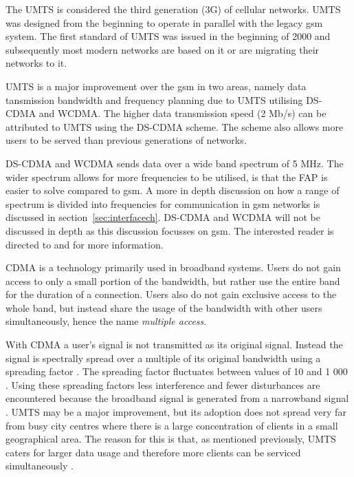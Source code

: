 The \gls{UMTS} is considered the third generation (3G) of cellular networks\cite{tabuglobalplanning3g,Eisenblatter}. \gls{UMTS} was designed from the beginning to operate in parallel with the legacy \gls{gsm} system. The first standard of \gls{UMTS} was issued in the beginning of 2000 and subsequently most modern networks are based on it or are migrating their networks to it\cite{tabuglobalplanning3g,Eisenblatter}.

UMTS is a major improvement over the \gls{gsm} in two areas, namely data tansmission bandwidth and frequency planning due to \gls{UMTS} utilising \gls{DS-CDMA} and \gls{WCDMA}\cite{tabuglobalplanning3g,Eisenblatter}. The higher data transmission speed (2 Mb/s) can be attributed to \gls{UMTS} using the \gls{DS-CDMA} scheme\cite{tabuglobalplanning3g,Eisenblatter}. The scheme also allows more users to be served than previous generations of networks\cite{tabuglobalplanning3g,Eisenblatter}. 

DS-CDMA and \gls{WCDMA} sends data over a wide band spectrum of 5 MHz. The wider spectrum allows for more frequencies to be utilised, is that the \gls{FAP} is easier to solve compared to \gls{gsm}\cite{tabuglobalplanning3g,Eisenblatter}\@. A more in depth discussion on how a range of spectrum is divided into frequencies for communication in \gls{gsm} networks is discussed in section~\ref{sec:interfacech}. \gls{DS-CDMA} and \gls{WCDMA} will not be discussed in depth as this discussion focusses on \gls{gsm}\@. The interested reader is directed to \cite{tabuglobalplanning3g} and \cite{wirelesstelcoMullet} for more information.

\Gls{CDMA} is a technology primarily used in broadband systems\cite{GSMArchitectureProtocolsServices}. Users do not gain access to only a small portion of the bandwidth, but rather use the entire band for the duration of a connection\cite{GSMArchitectureProtocolsServices}. Users also do not gain exclusive access to the whole band, but instead share the usage of the bandwidth with other users simultaneously, hence the name \emph{multiple access}\cite{GSMArchitectureProtocolsServices}.

With \gls{CDMA} a user's signal is not transmitted as its original signal. Instead the signal is spectrally spread over a multiple of its original bandwidth using a spreading factor \cite{GSMArchitectureProtocolsServices}. The spreading factor fluctuates between values of 10 and 1 000 \cite{GSMArchitectureProtocolsServices}. Using these spreading factors less interference and fewer disturbances are encountered because the broadband signal is generated from a narrowband signal \cite{GSMArchitectureProtocolsServices}.
UMTS may be a major improvement, but its adoption does not spread very far from busy city centres where there is a large concentration of clients in a small geographical area\cite{GSMArchitectureProtocolsServices}. The reason for this is that, as mentioned previously, \gls{UMTS} caters for larger data usage and therefore more clients can be serviced simultaneously \cite{GSMArchitectureProtocolsServices}.


